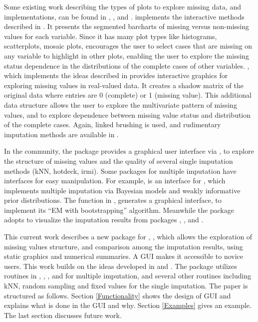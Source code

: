 \documentclass[article]{jss}
\begin{document}
Some existing work describing the types of plots to explore missing data, and implementations, can be found in \citet{unwin1996interactive}, \citet{swayne1998missing}, and \citet{templ2008visualization}.  implements the interactive methods described in \citet{unwin1996interactive}. It presents the segmented barcharts of missing versus non-missing values for each variable. Since it has many plot types like histograms, scatterplots, mosaic plots,  encourages the user to select cases that are missing on any variable to highlight in other plots, enabling the user to explore the missing status dependence in the distributions of the complete cases of other variables. , which implements the ideas described in \citet{swayne1998missing} provides interactive graphics for exploring missing values in real-valued data. It creates a shadow matrix of the original data where entries are 0 (complete) or 1 (missing value). This additional data structure allows the user to explore the multivariate pattern of missing values, and to explore dependence between missing value status and distribution of the complete cases. Again, linked brushing is used, and rudimentary imputation methods are available in  \citep{STLBC03}.

In the  community, the package  \citep{VIM} provides a graphical user interface via  \citep{VIMGUI}, to explore the structure of missing values and the quality of several single imputation methods (kNN, hotdeck, irmi). Some packages for multiple imputation have interfaces for easy manipulation. For example,  \citep{migui} is an interface for  \citep{mi}, which implements multiple imputation via Bayesian models and weakly informative prior distributions. The function  in  \citep{amelia}, generates a graphical interface, to implement its ``EM with bootstrapping'' algorithm. Meanwhile the package  \citep{mip} adopts  to visualize the imputation results from packages , , and .

This current work describes a new package for , , which allows the exploration of missing values structure, and comparison among the imputation results, using static graphics and numerical summaries. A GUI makes it accessible to novice users. This work builds on the ideas developed in \citet{unwin1996interactive} and \citet{swayne1998missing}. The package utilizes routines in , , , and  for multiple imputation, and several other routines including kNN, random sampling and fixed values for the single imputation. The paper is structured as follows. Section \ref{Functionality} shows the design of GUI and explains what is done in the GUI and why. Section \ref{Examples} gives an example. The last section discusses future work.
\end{document}
